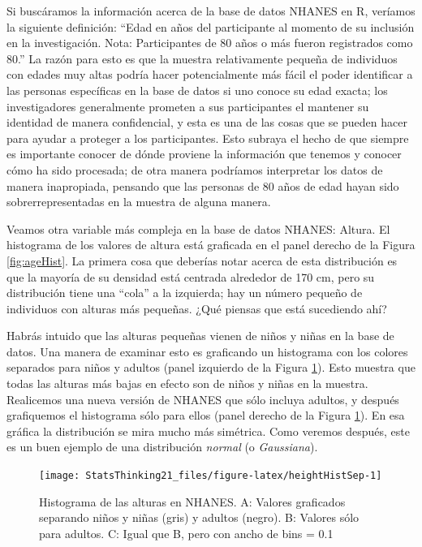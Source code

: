 \documentclass[
  12pt,
]{book}
\theoremstyle{definition}
\theoremstyle{definition}
\theoremstyle{definition}
\theoremstyle{remark}
\begin{document}
Si buscáramos la información acerca de la base de datos NHANES en R, veríamos la siguiente definición: ``Edad en años del participante al momento de su inclusión en la investigación. Nota: Participantes de 80 años o más fueron registrados como 80.'' La razón para esto es que la muestra relativamente pequeña de individuos con edades muy altas podría hacer potencialmente más fácil el poder identificar a las personas específicas en la base de datos si uno conoce su edad exacta; los investigadores generalmente prometen a sus participantes el mantener su identidad de manera confidencial, y esta es una de las cosas que se pueden hacer para ayudar a proteger a los participantes. Esto subraya el hecho de que siempre es importante conocer de dónde proviene la información que tenemos y conocer cómo ha sido procesada; de otra manera podríamos interpretar los datos de manera inapropiada, pensando que las personas de 80 años de edad hayan sido sobrerrepresentadas en la muestra de alguna manera.

Veamos otra variable más compleja en la base de datos NHANES: Altura. El histograma de los valores de altura está graficada en el panel derecho de la Figura \ref{fig:ageHist}. La primera cosa que deberías notar acerca de esta distribución es que la mayoría de su densidad está centrada alrededor de 170 cm, pero su distribución tiene una ``cola'' a la izquierda; hay un número pequeño de individuos con alturas más pequeñas. ¿Qué piensas que está sucediendo ahí?

Habrás intuido que las alturas pequeñas vienen de niños y niñas en la base de datos. Una manera de examinar esto es graficando un histograma con los colores separados para niños y adultos (panel izquierdo de la Figura \ref{fig:heightHistSep}). Esto muestra que todas las alturas más bajas en efecto son de niños y niñas en la muestra. Realicemos una nueva versión de NHANES que sólo incluya adultos, y después grafiquemos el histograma sólo para ellos (panel derecho de la Figura \ref{fig:heightHistSep}). En esa gráfica la distribución se mira mucho más simétrica. Como veremos después, este es un buen ejemplo de una distribución \emph{normal} (o \emph{Gaussiana}).

\begin{figure}
\texttt{[image: StatsThinking21\_files/figure-latex/heightHistSep-1]} \caption{Histograma de las alturas en NHANES. A: Valores graficados separando niños y niñas (gris) y adultos (negro). B: Valores sólo para adultos. C: Igual que B, pero con ancho de bins = 0.1}\label{fig:heightHistSep}
\end{figure}
\end{document}
